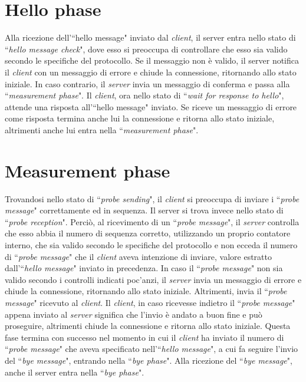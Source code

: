 \documentclass[a4paper, 12pt]{report}
\begin{document}
\section{Hello phase}

Alla ricezione dell'``hello message" inviato dal \textit{client}, il server entra nello stato di ``\textit{hello message check}", dove esso
si preoccupa di controllare che esso sia valido secondo le specifiche del protocollo. Se il messaggio non è valido, il server notifica il
\textit{client} con un messaggio di errore e chiude la connessione, ritornando allo stato iniziale. In caso contrario, il \textit{server}
invia un messaggio di conferma e passa alla ``\textit{measurement phase}".\newline
Il \textit{client}, ora nello stato di ``\textit{wait for response to hello}", attende una risposta all'``hello message" inviato. Se riceve
un messaggio di errore come risposta termina anche lui la connessione e ritorna allo stato iniziale, altrimenti anche lui entra nella
``\textit{measurement phase}".

\section{Measurement phase}

Trovandosi nello stato di ``\textit{probe sending}", il \textit{client} si preoccupa di inviare i ``\textit{probe message}" correttamente ed in 
sequenza.\newline
Il server si trova invece nello stato di ``\textit{probe reception}". Perciò, al ricevimento di un ``\textit{probe message}", il \textit{server}
controlla che esso abbia il numero di sequenza corretto, utilizzando un proprio contatore interno, che sia valido secondo le specifiche del protocollo
e non ecceda il numero di ``\textit{probe message}" che il \textit{client} aveva intenzione di inviare, valore estratto dall'``\textit{hello message}" inviato in precedenza.\newline
In caso il ``\textit{probe message}" non sia valido secondo i controlli indicati poc'anzi, il \textit{server} invia un messaggio di errore e chiude
la connessione, ritornando allo stato iniziale. Altrimenti, invia il ``\textit{probe message}" ricevuto al \textit{client}.\newline
Il \textit{client}, in caso ricevesse indietro il ``\textit{probe message}" appena inviato al \textit{server} significa che l'invio è andato a buon fine
e può proseguire, altrimenti chiude la connessione e ritorna allo stato iniziale.\newline
Questa fase termina con successo nel momento in cui il \textit{client} ha inviato il numero di ``\textit{probe message}" che aveva specificato 
nell'``\textit{hello message}", a cui fa seguire l'invio del ``\textit{bye message}", entrando nella ``\textit{bye phase}".\newline
Alla ricezione del ``\textit{bye message}", anche il server entra nella ``\textit{bye phase}".
\end{document}
